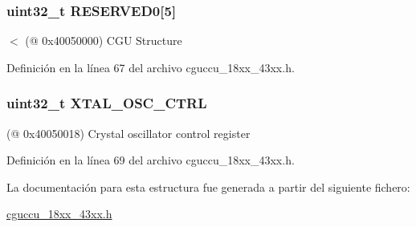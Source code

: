 \subsubsection[{\texorpdfstring{R\+E\+S\+E\+R\+V\+E\+D0}{RESERVED0}}]{ uint32\+\_\+t R\+E\+S\+E\+R\+V\+E\+D0\mbox{[}5\mbox{]}}\hypertarget{struct_l_p_c___c_g_u___t_abcea022b884a52d0aa9657e2cdd15ce1}{}\label{struct_l_p_c___c_g_u___t_abcea022b884a52d0aa9657e2cdd15ce1}
$<$ (@ 0x40050000) C\+GU Structure 

Definición en la línea 67 del archivo cguccu\+\_\+18xx\+\_\+43xx.\+h.

\subsubsection[{\texorpdfstring{X\+T\+A\+L\+\_\+\+O\+S\+C\+\_\+\+C\+T\+RL}{XTAL_OSC_CTRL}}]{ uint32\+\_\+t X\+T\+A\+L\+\_\+\+O\+S\+C\+\_\+\+C\+T\+RL}\hypertarget{struct_l_p_c___c_g_u___t_a08fa4263afc50502f29cf2659239b808}{}\label{struct_l_p_c___c_g_u___t_a08fa4263afc50502f29cf2659239b808}
(@ 0x40050018) Crystal oscillator control register 

Definición en la línea 69 del archivo cguccu\+\_\+18xx\+\_\+43xx.\+h.



La documentación para esta estructura fue generada a partir del siguiente fichero\+:\begin{DoxyCompactItemize}
\item 
\hyperlink{cguccu__18xx__43xx_8h}{cguccu\+\_\+18xx\+\_\+43xx.\+h}\end{DoxyCompactItemize}
